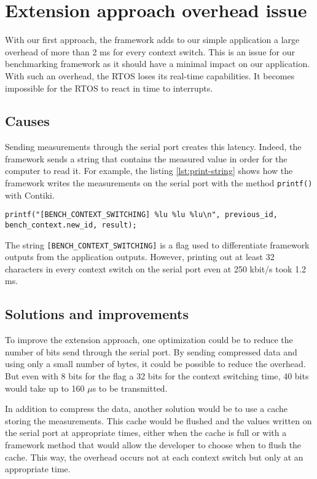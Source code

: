 \section{Extension approach overhead issue\label{sec:overhead}}

With our first approach, the framework adds to our simple application a large overhead of more than 2 ms for every context switch.
This is an issue for our benchmarking framework as it should have a minimal impact on our application.
With such an overhead, the RTOS loses its real-time capabilities.
It becomes impossible for the RTOS to react in time to interrupts.

\subsection{Causes}

Sending measurements through the serial port creates this latency.
Indeed, the framework sends a string that contains the measured value in order for the computer to read it.
For example, the listing \ref{lst:print-string} shows how the framework writes the measurements on the serial port with the method \texttt{printf()} with Contiki.

\begin{lstlisting}[style=CStyle, float, label={lst:print-string}, caption={writting the measurements to the serial port with Contiki}]
  printf("[BENCH_CONTEXT_SWITCHING] %lu %lu %lu\n", previous_id, bench_context.new_id, result);
\end{lstlisting}

The string \texttt{[BENCH\_CONTEXT\_SWITCHING]} is a flag used to differentiate framework outputs from the application outputs.
However, printing out at least 32 characters in every context switch on the serial port even at 250 kbit/s took 1.2 ms.

\subsection{Solutions and improvements}

To improve the extension approach, one optimization could be to reduce the number of bits send through the serial port.
By sending compressed data and using only a small number of bytes, it could be possible to reduce the overhead.
But even with 8 bits for the flag a 32 bits for the context switching time, 40 bits would take up to 160 $\mu$s to be transmitted.

In addition to compress the data, another solution would be to use a cache storing the measurements.
This cache would be flushed and the values written on the serial port at appropriate times, either when the cache is full or with a framework method that would allow the developer to choose when to flush the cache.
This way, the overhead occurs not at each context switch but only at an appropriate time.

